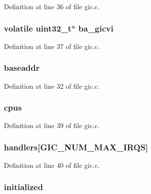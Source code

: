 \-Definition at line 36 of file gic.\-c.

\hypertarget{structgic_a0dc2d2fdf039752758490aa59725fce2}{
\subsubsection[{ba\-\_\-gicvi}]{\setlength{\rightskip}{0pt plus 5cm}volatile {\bf uint32\-\_\-t}$\ast$ {\bf ba\-\_\-gicvi}}}\label{structgic_a0dc2d2fdf039752758490aa59725fce2}


\-Definition at line 37 of file gic.\-c.

\hypertarget{structgic_ab15249e04d1bee1b0997011912a87cbf}{
\subsubsection[{baseaddr}]{ {\bf baseaddr}}}\label{structgic_ab15249e04d1bee1b0997011912a87cbf}


\-Definition at line 32 of file gic.\-c.

\hypertarget{structgic_a148b00861c88b4f5d5bf006071fbdc04}{
\subsubsection[{cpus}]{ {\bf cpus}}}\label{structgic_a148b00861c88b4f5d5bf006071fbdc04}


\-Definition at line 39 of file gic.\-c.

\hypertarget{structgic_a030df411878f4e7c744256f330692e95}{
\subsubsection[{handlers}]{ {\bf handlers}\mbox{[}{\bf \-G\-I\-C\-\_\-\-N\-U\-M\-\_\-\-M\-A\-X\-\_\-\-I\-R\-Q\-S}\mbox{]}}}\label{structgic_a030df411878f4e7c744256f330692e95}


\-Definition at line 40 of file gic.\-c.

\hypertarget{structgic_a874884c7efa14474f67d1a82b795ce3c}{
\subsubsection[{initialized}]{ {\bf initialized}}}\label{structgic_a874884c7efa14474f67d1a82b795ce3c}


